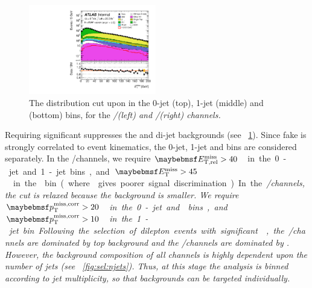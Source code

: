 \begin{figure}
	\hfill
	\includegraphics[width=0.495\textwidth]{tex/selection/eemm_CutZVeto_2jetincl_MET_mh125_log}
	\caption{The \met distribution cut upon in the 0-jet (top), 1-jet (middle) and 
	\twojet (bottom) bins, for the \em/\me (left) and \ee/\mm (right) channels.}
	\label{fig:sel:met}
\end{figure}

Requiring significant \met suppresses the \DYll and di-jet backgrounds (see 
\Figure~\ref{fig:sel:met}). Since fake \met is strongly correlated to event kinematics, 
the 0-jet, 1-jet and \twojet bins are considered separately. In the \ee/\mm channels, we 
require \unit{$\metrel > 40$}{\GeV} in the 0-jet and 1-jet bins, and 
\unit{$\met > 45$}{\GeV} in the \twojet bin (where \metrel gives poorer signal 
discrimination). In the \em/\me channels, the \met cut is relaxed because the \DYll 
background is smaller. We require \unit{$\corrtrackmet > 20$}{\GeV} in the 0-jet and 
\twojet bins, and \unit{$\corrtrackmet > 10$}{\GeV} in the 1-jet bin.

Following the selection of dilepton events with significant \met, the \em/\me channels 
are dominated by top background and the \ee/\mm channels are dominated by \DYll. 
However, the background composition of all channels is highly dependent upon the number 
of jets (see \Figure~\ref{fig:sel:njets}). Thus, at this stage the analysis is binned 
according to jet multiplicity, so that backgrounds can be targeted individually.

